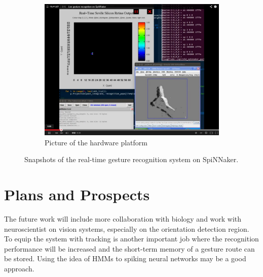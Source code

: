 \documentclass[journal]{journal}
\begin{document}
\begin{figure}
\begin{subfigure}[t]{0.42\textwidth}
		\includegraphics[width=\textwidth]{pics/live.png}
		\caption{Picture of the hardware platform}
	    \label{fig:live3}
	\end{subfigure}	

\caption{Snapshots of the real-time gesture recognition system on SpiNNaker.
}
\label{fig:live}
\end{figure}
  

\section{Plans and Prospects}
The future work will include more collaboration with biology and work with neuroscientist on vision systems, especially on the orientation detection region. 
To equip the system with tracking is another important job where the recognition performance will be increased and the short-term memory of a gesture route can be stored. Using the idea of HMMs to spiking neural networks may be a good approach. 

\end{document}
